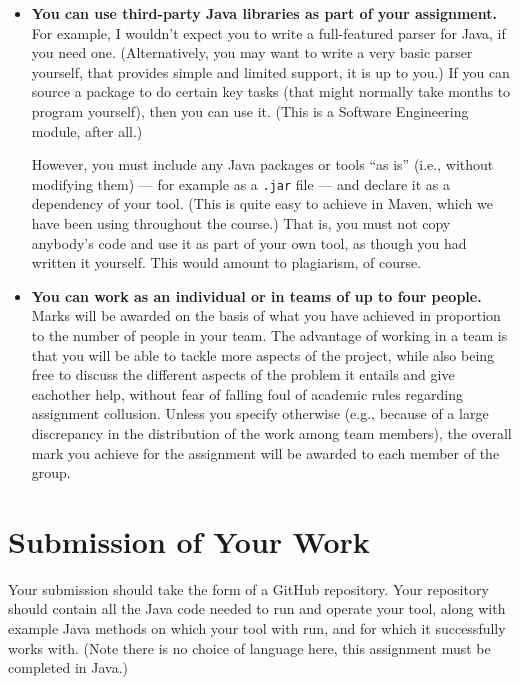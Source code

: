 \begin{itemize}
    \item {\bf You can use third-party Java libraries as part of your
    assignment.} For example, I wouldn't expect you to write a full-featured
    parser for Java, if you need one. (Alternatively, you may want to write a
    very basic parser yourself, that provides simple and limited support, it is
    up to you.)
    If you can source a package to do certain key tasks (that might normally
    take months to program yourself), then you can use it. (This is a Software
    Engineering module, after all.)
    
    However, you must include any Java packages or tools ``as is'' (i.e.,
    without modifying them) --- for example as a {\tt .jar} file --- and declare
    it as a dependency of your tool. (This is quite easy to achieve in Maven,
    which we have been using throughout the course.) That is, you must not copy
    anybody's code and use it as part of your own tool, as though you had
    written it yourself. This would amount to plagiarism, of course.

    \item {\bf You can work as an individual or in teams of up to four people.}    
    Marks will be awarded on the basis of what you have achieved in proportion
    to the number of people in your team. The advantage of working in a team is
    that you will be able to tackle more aspects of the project, while also
    being free to discuss the different aspects of the problem it entails and
    give eachother help, without fear of falling foul of academic rules
    regarding assignment collusion. Unless you specify otherwise (e.g., because
    of a large discrepancy in the distribution of the work among team members),
    the overall mark you achieve for the assignment will be awarded to each
    member of the group.
\end{itemize}


\section{Submission of Your Work}
\label{sec:submission}

Your submission should take the form of a GitHub repository. Your repository
should contain all the Java code needed to run and operate your tool, along with
example Java methods on which your tool with run, and for which it successfully
works with. (Note there is no choice of language here, this assignment must be
completed in Java.)

